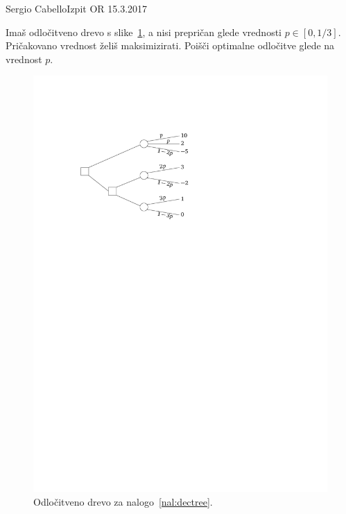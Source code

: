 \begin{naloga}{Sergio Cabello}{Izpit OR 15.3.2017}
\begin{vprasanje}
Imaš odločitveno drevo s slike~\ref{fig:dectree},
a nisi prepričan glede vrednosti $p \in [0, 1/3]$.
Pričakovano vrednost želiš maksimizirati.
Poišči optimalne odločitve glede na vrednost $p$.

\begin{figure}[t]
	\centering
	\includegraphics{slike/decision-tree.pdf}
    \caption{Odločitveno drevo za nalogo~\ref{nal:dectree}.}
    \label{fig:dectree}
\end{figure}

\end{vprasanje}
\begin{odgovor}
\end{odgovor}
\end{naloga}


